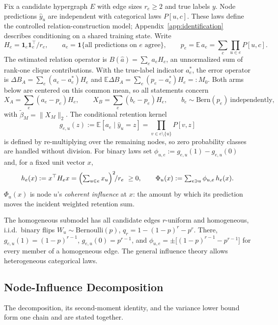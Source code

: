 \documentclass[preprint,11pt]{elsarticle}
\newcommand{\ind}[1]{\mathbf{1}\{#1\}}
\begin{document}
Fix a candidate hypergraph $E$ with edge sizes $r_e\ge2$ and true
labels $y$. Node predictions $\hat y_u$ are independent with
categorical laws $P[u,c]$. These laws define the controlled
relation-construction model; Appendix~\ref{app:identification}
describes conditioning on a shared training state. Write
\[
H_e=\mathbf 1_e\mathbf 1_e^\top/r_e,\qquad
a_e=\ind{\text{all predictions on }e\text{ agree}},\qquad
p_e=\mathbb E\,a_e=\sum_c\prod_{u\in e}P[u,c].
\]
The estimated relation operator is $B(\hat a)=\sum_ea_eH_e$, an
unnormalized sum of rank-one clique contributions. With the true-label
indicator $a_e^*$, the error operator is $\Delta B_A=\sum_e(a_e-a_e^*)H_e$
and $\mathbb E\Delta B_A=\sum_e(p_e-a_e^*)H_e=:M_0$. Both arms below
are centered on this common mean, so all statements concern
\[
X_A=\sum_e(a_e-p_e)H_e,\qquad
X_B=\sum_e(b_e-p_e)H_e,\qquad b_e\sim\mathrm{Bern}(p_e)
\ \text{independently,}
\]
with $\widetilde\beta_M=\|X_M\|_2$. The conditional retention kernel
\[
g_{e,u}(z):=\mathbb E[a_e\mid \hat y_u=z]
=\prod_{v\in e\setminus\{u\}}P[v,z]
\]
is defined by re-multiplying over the remaining nodes, so zero
probability classes are handled without division. For binary laws set
$\phi_{u,e}:=g_{e,u}(1)-g_{e,u}(0)$ and, for a fixed unit vector $x$,
\[
h_e(x):=x^\top H_ex=\Bigl(\textstyle\sum_{u\in e}x_u\Bigr)^2\!/r_e\ \ge0,
\qquad
\Phi_u(x):=\sum_{e\ni u}\phi_{u,e}\,h_e(x).
\]
$\Phi_u(x)$ is node $u$'s \emph{coherent influence} at $x$: the amount
by which its prediction moves the incident weighted retention sum.

The homogeneous submodel has all
candidate edges $r$-uniform and homogeneous, i.i.d.\ binary flips
$W_u\sim\mathrm{Bernoulli}(p)$, $q_r=1-(1-p)^r-p^r$. There,
$g_{e,u}(1)=(1-p)^{r-1}$, $g_{e,u}(0)=p^{r-1}$, and
$\phi_{u,e}=\pm\bigl[(1-p)^{r-1}-p^{r-1}\bigr]$ for every member of a
homogeneous edge. The general influence theory allows heterogeneous
categorical laws.



\subsection{Node-Influence Decomposition}\label{sec:decomp}

The decomposition, its second-moment identity, and the variance lower
bound form one chain and are stated together.
\end{document}
